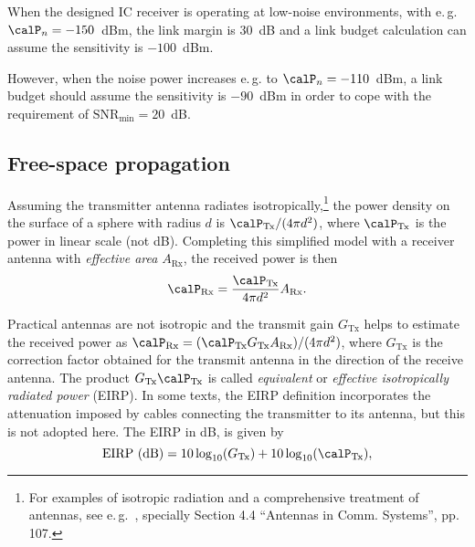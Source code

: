 When the designed IC receiver is operating at low-noise environments, with 
e.\,g. $\calP_n=-150$~dBm, the link margin is 30~dB and a link budget calculation
can assume the sensitivity is $-100$~dBm.

However, when the noise power increases e.\,g. to $\calP_n=-110$~dBm, a link
budget should assume the sensitivity is $-90$~dBm in order to cope with the
requirement of $\textrm{SNR}_{\textrm{min}}=20$~dB.
\eExample 



\subsection{Free-space propagation}

Assuming the transmitter antenna radiates isotropically,\footnote{For examples of isotropic 
radiation and a comprehensive treatment of 
antennas, see e.\,g.~\cite{Stutzman12}, specially Section 4.4 ``Antennas in Comm. Systems'', pp. 107.} the power density on the surface
of a sphere with radius $d$ is $\calP_{\textrm{Tx}} / (4 \pi d^2)$, where 
$\calP_{\textrm{Tx}}$ is the power in linear scale (not dB).
Completing this simplified model with a receiver antenna with \emph{effective area} $A_{\textrm{Rx}}$, the 
received power is then
\begin{equation}
\calP_{\textrm{Rx}}  =   \frac{ \calP_{\textrm{Tx}} }{4 \pi d^2} A_{\textrm{Rx}}.
\label{eq:receivedPowerFreeSpace}
\end{equation}

Practical antennas are not isotropic and the transmit gain $G_{\textrm{Tx}}$ helps
to estimate the received power as $\calP_{\textrm{Rx}}  = (\calP_{\textrm{Tx}} G_{\textrm{Tx}} A_{\textrm{Rx}}) / (4 \pi d^2)$,
where $G_{\textrm{Tx}}$ is the correction factor obtained for the
transmit antenna in the direction of the receive antenna. 
The product $G_{\textrm{Tx}} \calP_{\textrm{Tx}}$ is called \emph{equivalent} or \emph{effective
isotropically radiated power} (EIRP). In some texts, the EIRP definition incorporates the
attenuation imposed by cables connecting the transmitter to its antenna, but this is not 
adopted here. The EIRP in dB, is given by
\begin{equation}
\textrm{EIRP (dB)} = 10 \log_{10} (G_{\textrm{Tx}}) + 10 \log_{10} (\calP_{\textrm{Tx}}),
\label{eq:eirp_dB}
\end{equation}

